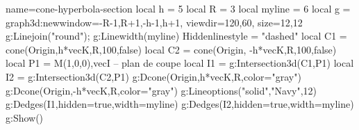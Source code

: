 \documentclass[varwidth, border = 3pt]{standalone}
\begin{document}
\begin{luadraw}{name=cone-hyperbola-section}
local h = 5
local R = 3
local myline = 6
local g = graph3d:new{window={-R-1,R+1,-h-1,h+1}, viewdir={120,60}, size={12,12}}
g:Linejoin("round"); g:Linewidth(myline)
Hiddenlinestyle = "dashed"
local C1 = cone(Origin,h*vecK,R,100,false)
local C2 = cone(Origin, -h*vecK,R,100,false)
local P1 = {M(1,0,0),vecI} -- plan de coupe
local I1 = g:Intersection3d(C1,P1)
local I2 = g:Intersection3d(C2,P1)
g:Dcone(Origin,h*vecK,R,{color="gray"}) g:Dcone(Origin,-h*vecK,R,{color="gray"})
g:Lineoptions("solid","Navy",12)
g:Dedges(I1,{hidden=true,width=myline})
g:Dedges(I2,{hidden=true,width=myline})
g:Show()
\end{luadraw}
\end{document}
